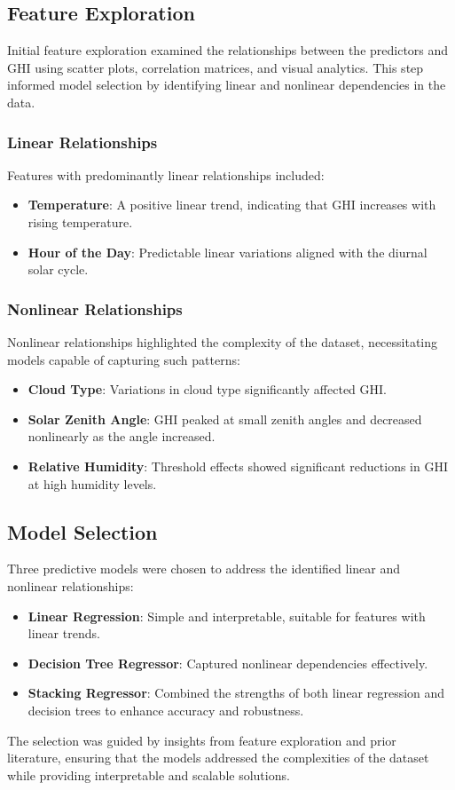\documentclass[10pt,twocolumn]{article}
\begin{document}
\begin{itemize}
\subsection{Feature Exploration}
Initial feature exploration examined the relationships between the predictors and GHI using scatter plots, correlation matrices, and visual analytics. This step informed model selection by identifying linear and nonlinear dependencies in the data.

\subsubsection{Linear Relationships}
Features with predominantly linear relationships included:
\begin{itemize}
    \item \textbf{Temperature}: A positive linear trend, indicating that GHI increases with rising temperature.
    \item \textbf{Hour of the Day}: Predictable linear variations aligned with the diurnal solar cycle.
\end{itemize}

\subsubsection{Nonlinear Relationships}
Nonlinear relationships highlighted the complexity of the dataset, necessitating models capable of capturing such patterns:
\begin{itemize}
    \item \textbf{Cloud Type}: Variations in cloud type significantly affected GHI.
    \item \textbf{Solar Zenith Angle}: GHI peaked at small zenith angles and decreased nonlinearly as the angle increased.
    \item \textbf{Relative Humidity}: Threshold effects showed significant reductions in GHI at high humidity levels.
\end{itemize}

\subsection{Model Selection}
Three predictive models were chosen to address the identified linear and nonlinear relationships:
\begin{itemize}
    \item \textbf{Linear Regression}: Simple and interpretable, suitable for features with linear trends.
    \item \textbf{Decision Tree Regressor}: Captured nonlinear dependencies effectively.
    \item \textbf{Stacking Regressor}: Combined the strengths of both linear regression and decision trees to enhance accuracy and robustness.
\end{itemize}
The selection was guided by insights from feature exploration and prior literature, ensuring that the models addressed the complexities of the dataset while providing interpretable and scalable solutions.


\end{itemize}
\end{document}
